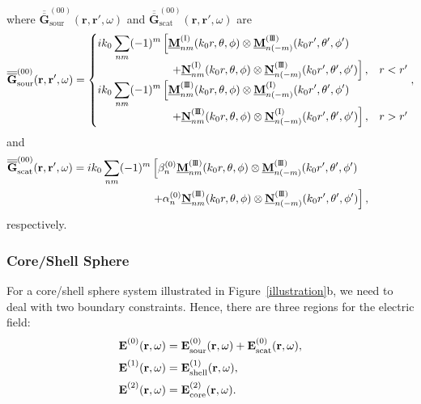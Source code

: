 \documentclass[journal=jacsat,manuscript=article,layout=traditional]{achemso}
\newcommand*\tensorg{\overline{\overline{\mathbf{G}}}}
\newcommand{\norF}[1]{\underline{\vb{#1}}}
\newcommand{\joinR}{\hspace{-.17em}}
\newcommand{\RomanI}{\scriptsize\textrm{I}}
\newcommand{\RomanIII}{\mbox{\RomanI\joinR\RomanI\joinR\RomanI}}
\newcommand{\subsubsectiontoc}[1]{\subsubsection{#1}\addcontentsline{toc}{subsubsection}{#1}}
\begin{document}
where $\tensorg_\mathrm{sour}^{(00)}(\mathbf{r,r'},\omega)$ and $\tensorg_\mathrm{scat}^{(00)}(\mathbf{r,r'},\omega)$ are
\begin{align}
    \label{G00sour}
    \overline{\overline{\mathbf{G}}}_\mathrm{sour}^{(00)}(\mathbf{r,r'},\omega)=
    \begin{cases}
        \displaystyle
        ik_0 \sum_{nm}(-1)^m\left[\norF{M}_{\mathstrut{nm}}^{(\RomanI)}(k_0r,\theta,\phi)
        \otimes\norF{M}_{n(-m)}^{(\RomanIII)}(k_0r',\theta',\phi')\right.\\
        \hspace{2.34cm}\left.+\norF{N}_{\mathstrut{nm}}^{(\RomanI)}(k_0r,\theta,\phi)
        \otimes\norF{N}_{n(-m)}^{(\RomanIII)}(k_0r',\theta',\phi')\right], & r < r'\\
        \displaystyle
        ik_0 \sum_{nm}(-1)^m\left[\norF{M}_{\mathstrut{nm}}^{(\RomanIII)}(k_0r,\theta,\phi)
        \otimes\norF{M}_{n(-m)}^{(\RomanI)}(k_0r',\theta',\phi')\right.\\
        \hspace{2.34cm}\left.+\norF{N}_{\mathstrut{nm}}^{(\RomanIII)}(k_0r,\theta,\phi)
        \otimes\norF{N}_{n(-m)}^{(\RomanI)}(k_0r',\theta',\phi')\right], & r > r'
    \end{cases},%
\end{align}
and 
\begin{align}
    \nonumber
    \overline{\overline{\mathbf{G}}}_\mathrm{scat}^{(00)}(\mathbf{r,r'},\omega)=
    ik_0 \sum_{nm}(-1)^m
    &\left[\beta_n^{(0)}\norF{M}_{\mathstrut{nm}}^{(\RomanIII)}(k_0r,\theta,\phi)
    \otimes\norF{M}_{n(-m)}^{(\RomanIII)}(k_0r',\theta',\phi')\right.\\
    &\left.+\alpha_n^{(0)}\norF{N}_{\mathstrut{nm}}^{(\RomanIII)}(k_0r,\theta,\phi)\otimes\norF{N}_{n(-m)}^{(\RomanIII)}(k_0r',\theta',\phi')\right],\hspace{1.42 cm}
    \label{G00scat}
\end{align}
respectively.
\newpage
\subsubsectiontoc{Core/Shell Sphere}
%
For a core/shell sphere system illustrated in Figure~\ref{illustration}b, we need to deal with two boundary constraints. Hence, there are three regions for the electric field:
\begin{subequations}
    \begin{align}
        \label{cssphereE0}
        &\mathbf{E}_{\mathstrut}^{(0)}(\mathbf{r},\omega) = \mathbf{E}_{\textrm{sour}\mathstrut}^{(0)}(\mathbf{r},\omega) + \mathbf{E}_{\textrm{scat}\mathstrut}^{(0)}(\mathbf{r},\omega),\\
        \label{cssphereE1}
        &\mathbf{E}_{\mathstrut}^{(1)}(\mathbf{r},\omega) = \mathbf{E}_{\mathstrut\textrm{shell}}^{(1)}(\mathbf{r},\omega),\\
        \label{cssphereE2}
        &\mathbf{E}_{\mathstrut}^{(2)}(\mathbf{r},\omega) =     \mathbf{E}_{\mathstrut\textrm{core}}^{(2)}(\mathbf{r},\omega).
    \end{align}%
\end{subequations}
\end{document}
